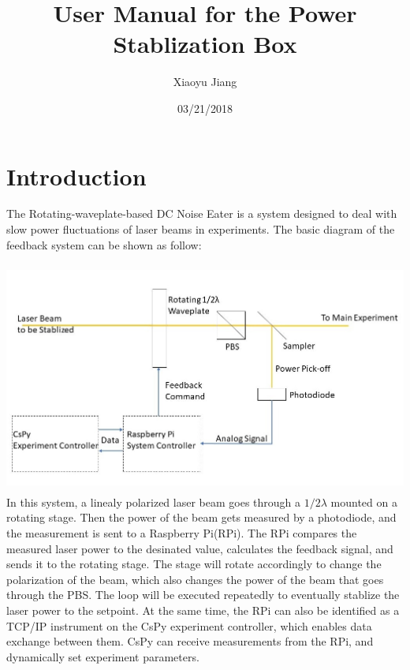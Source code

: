 \documentclass{article}
\title{User Manual for the Power Stablization Box}
\author{Xiaoyu Jiang}
\date{03/21/2018}
\begin{document}
\maketitle
\section{Introduction}

The Rotating-waveplate-based DC Noise Eater is a system designed to deal with slow power fluctuations of laser beams in experiments. The basic diagram of the feedback system can be shown as follow:

\includegraphics[height=3in]{noiseeaterdiagram.JPG}\newline
In this system, a linealy polarized laser beam goes through a $1/2\lambda$ mounted on a rotating stage. Then the power of the beam gets measured by a photodiode, and the measurement is sent to a Raspberry Pi(RPi). The RPi compares the measured laser power to the desinated value, calculates the feedback signal, and sends it to the rotating stage. The stage will rotate accordingly to change the polarization of the beam, which also changes the power of the beam that goes through the PBS. The loop will be executed repeatedly to eventually stablize the laser power to the setpoint. At the same time, the RPi can also be identified as a TCP/IP instrument on the CsPy experiment controller, which enables data exchange between them. CsPy can receive measurements from the RPi, and dynamically set experiment parameters. \newline\newline
\end{document}
